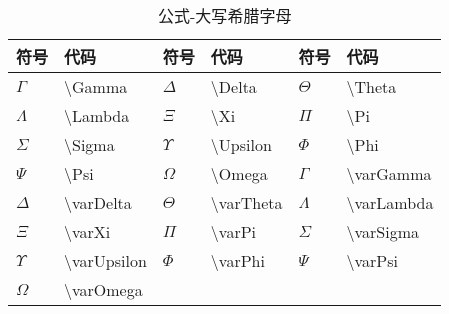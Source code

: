 \documentclass[UTF8,fontset=ubuntu]{ctexart}
\begin{document}
\begin{table}[H]
\begin{minipage}{\textwidth}
\begin{tabular}{l l l l l l}
	\hline
	符号 & 代码 & 符号 & 代码 & 符号 & 代码\\
	\hline
	$\Gamma$ & \textbackslash Gamma & $\Delta$ & \textbackslash Delta & $\Theta$ & \textbackslash Theta\\
	$\Lambda$ & \textbackslash Lambda & $\Xi$ & \textbackslash Xi & $\Pi$ & \textbackslash Pi\\
	$\Sigma$ & \textbackslash Sigma & $\Upsilon$ & \textbackslash Upsilon & $\Phi$ & \textbackslash Phi\\
	$\Psi$ & \textbackslash Psi & $\Omega$ & \textbackslash Omega & $\varGamma$ & \textbackslash varGamma\\
	$\varDelta$ & \textbackslash varDelta & $\varTheta$ & \textbackslash varTheta & $\varLambda$ & \textbackslash varLambda\\
	$\varXi$ & \textbackslash varXi & $\varPi$ & \textbackslash varPi & $\varSigma$ & \textbackslash varSigma\\
	$\varUpsilon$ & \textbackslash varUpsilon & $\varPhi$ & \textbackslash varPhi & $\varPsi$ & \textbackslash varPsi\\
	$\varOmega$ & \textbackslash varOmega\\
	\hline
\end{tabular}
\end{minipage}
\caption{公式-大写希腊字母}
\end{table}
\end{document}
